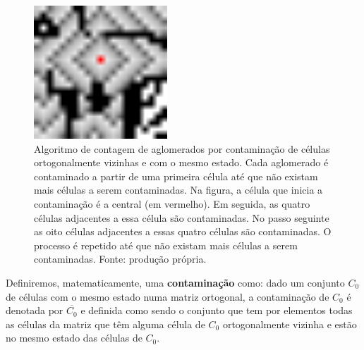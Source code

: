 \documentclass[
	12pt,				%
	openright,			%
	twoside,			%
	a4paper,			%
	english,			%
	french,				%
	spanish,			%
	brazil				%
	]{abntex2}
\begin{document}
\begin{figure}
    \centering
    \includegraphics[width=5cm]{contamination.png}
    \caption{Algoritmo de contagem de aglomerados por contaminação de células ortogonalmente vizinhas e com o mesmo estado. Cada aglomerado é contaminado a partir de uma primeira célula até que não existam mais células a serem contaminadas. Na figura, a célula que inicia a contaminação é a central (em vermelho). Em seguida, as quatro células adjacentes a essa célula são contaminadas. No passo seguinte as oito células adjacentes a essas quatro células são contaminadas. O processo é repetido até que não existam mais células a serem contaminadas. Fonte: produção própria.}
    \label{fig:contamination}
\end{figure}

 Definiremos, matematicamente, uma \textbf{contaminação} como: dado um conjunto $C_0$ de células com o mesmo estado numa matriz ortogonal, a contaminação de $C_0$ é denotada por $\overline{C_0}$ e definida como sendo o conjunto que tem por elementos todas as células da matriz que têm alguma célula de $C_0$ ortogonalmente vizinha e estão no mesmo estado das células de $C_0$. 
\end{document}
